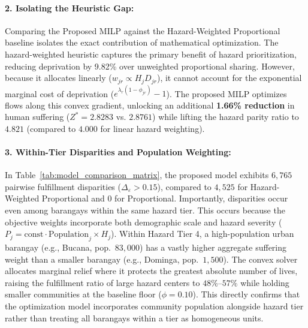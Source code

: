 \paragraph{2. Isolating the Heuristic Gap:} Comparing the Proposed MILP against the Hazard-Weighted Proportional baseline isolates the exact contribution of mathematical optimization. The hazard-weighted heuristic captures the primary benefit of hazard prioritization, reducing deprivation by 9.82\% over unweighted proportional sharing. However, because it allocates linearly ($w_{jr} \propto H_j D_{jr}$), it cannot account for the exponential marginal cost of deprivation ($e^{\lambda_r(1-\phi_{jr})} - 1$). The proposed MILP optimizes flows along this convex gradient, unlocking an additional \textbf{1.66\% reduction} in human suffering ($Z^* = 2.8283$ vs. $2.8761$) while lifting the hazard parity ratio to $4.821$ (compared to $4.000$ for linear hazard weighting).

\paragraph{3. Within-Tier Disparities and Population Weighting:} In Table~\ref{tab:model_comparison_matrix}, the proposed model exhibits $6{,}765$ pairwise fulfillment disparities ($\Delta_{\varepsilon} > 0.15$), compared to $4{,}525$ for Hazard-Weighted Proportional and $0$ for Proportional. Importantly, disparities occur even among barangays within the same hazard tier. This occurs because the objective weights incorporate both demographic scale and hazard severity ($P_j = \text{const} \cdot \text{Population}_j \times H_j$). Within Hazard Tier 4, a high-population urban barangay (e.g., Bucana, pop.~$83{,}000$) has a vastly higher aggregate suffering weight than a smaller barangay (e.g., Dominga, pop.~$1{,}500$). The convex solver allocates marginal relief where it protects the greatest absolute number of lives, raising the fulfillment ratio of large hazard centers to $48\%$--$57\%$ while holding smaller communities at the baseline floor ($\phi = 0.10$). This directly confirms that the optimization model incorporates community population alongside hazard tier rather than treating all barangays within a tier as homogeneous units.

